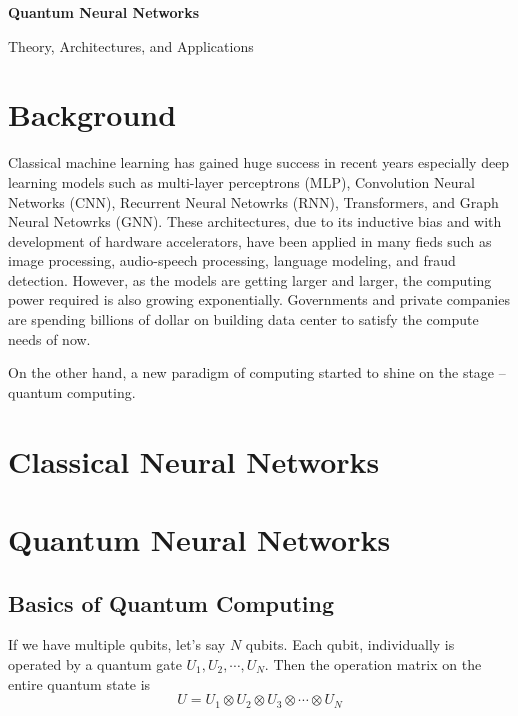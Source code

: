 \documentclass[12pt]{article}
\numberwithin{equation}{section}  %
\theoremstyle{definition}
\theoremstyle{plain}
\theoremstyle{remark}
\newcommand{\DocumentTitle}{Quantum Neural Networks}
\newcommand{\DocumentSubtitle}{Theory, Architectures, and Applications}
\begin{document}
\begin{titlepage}
    \centering
    \vspace*{0.30\textheight}

    {\Huge\bfseries
        \DocumentTitle
    \par}

    \vspace{1.25em}

    {\Large\color{gray}
        \DocumentSubtitle
    \par}

    \vfill
\end{titlepage}

\section{Background}
Classical machine learning has gained huge success in recent years especially deep learning models such as multi-layer perceptrons (MLP), Convolution Neural Networks (CNN), Recurrent Neural Netowrks (RNN), Transformers, and Graph Neural Netowrks (GNN). These architectures, due to its inductive bias and with development of hardware accelerators, have been applied in many fieds such as image processing, audio-speech processing, language modeling, and fraud detection. However, as the models are getting larger and larger, the computing power required is also growing exponentially. Governments and private companies are spending billions of dollar on building data center to satisfy the compute needs of now. 

On the other hand, a new paradigm of computing started to shine on the stage -- quantum computing. 

\section{Classical Neural Networks}


\section{Quantum Neural Networks}

\subsection{Basics of Quantum Computing}
If we have multiple qubits, let's say $N$ qubits. Each qubit, individually is operated by a quantum gate $U_1,U_2,\cdots,U_N$. Then the operation matrix on the entire quantum state is
\[U=U_1\otimes U_2\otimes U_3\otimes \cdots \otimes U_N\]
\end{document}
